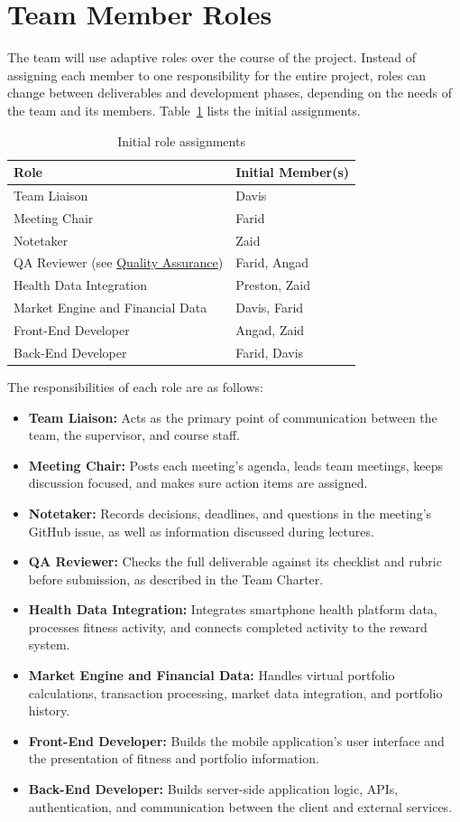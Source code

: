 \documentclass{article}
\begin{document}
\section{Team Member Roles}

The team will use adaptive roles over the course of the project. Instead of assigning each member to one responsibility for the entire project, roles can change between deliverables and development phases, depending on the needs of the team and its members. Table~\ref{tab:roles} lists the initial assignments.

\begin{table}[H]
\centering
\caption{Initial role assignments}
\label{tab:roles}
\begin{tabular}{ll}
\toprule
\textbf{Role} & \textbf{Initial Member(s)} \\
\midrule
Team Liaison & Davis \\
Meeting Chair & Farid \\
Notetaker & Zaid\\
QA Reviewer (see \hyperref[sec:quality-assurance]{Quality Assurance}) & Farid, Angad \\
Health Data Integration & Preston, Zaid \\
Market Engine and Financial Data & Davis, Farid \\
Front-End Developer & Angad, Zaid \\
Back-End Developer & Farid, Davis \\
\bottomrule
\end{tabular}
\end{table}

The responsibilities of each role are as follows:
\begin{itemize}
  \item \textbf{Team Liaison:} Acts as the primary point of communication between the team, the supervisor, and course staff.
  \item \textbf{Meeting Chair:} Posts each meeting's agenda, leads team meetings, keeps discussion focused, and makes sure action items are assigned.
  \item \textbf{Notetaker:} Records decisions, deadlines, and questions in the meeting's GitHub issue, as well as information discussed during lectures.
  \item \textbf{QA Reviewer:} Checks the full deliverable against its checklist and rubric before submission, as described in the Team Charter.
  \item \textbf{Health Data Integration:} Integrates smartphone health platform data, processes fitness activity, and connects completed activity to the reward system.
  \item \textbf{Market Engine and Financial Data:} Handles virtual portfolio calculations, transaction processing, market data integration, and portfolio history.
  \item \textbf{Front-End Developer:} Builds the mobile application's user interface and the presentation of fitness and portfolio information.
  \item \textbf{Back-End Developer:} Builds server-side application logic, APIs, authentication, and communication between the client and external services.
\end{itemize}
\end{document}
